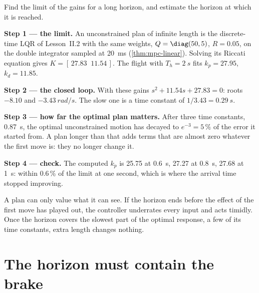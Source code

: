 \begin{example}
\label{ex:horizon-lqr}
Find the limit of the gains for a long horizon, and estimate the horizon at which it is reached.

\textbf{Step 1 — the limit.} An unconstrained plan of infinite length is the discrete-time LQR of Lesson~II.2 with the same weights, $Q = \diag(50, 5)$, $R = 0.05$, on the double integrator sampled at \SI{20}{ms} (\cref{thm:mpc-linear}). Solving its Riccati equation gives $K = [\,27.83 \;\; 11.54\,]$. The flight with $T_h = \SI{2}{s}$ fits $k_p = 27.95$, $k_d = 11.85$.

\textbf{Step 2 — the closed loop.} With these gains $s^2 + 11.54s + 27.83 = 0$: roots $-8.10$ and $\SI{-3.43}{rad/s}$. The slow one is a time constant of $1/3.43 = \SI{0.29}{s}$.

\textbf{Step 3 — how far the optimal plan matters.} After three time constants, \SI{0.87}{s}, the optimal unconstrained motion has decayed to $e^{-3} = 5\,\%$ of the error it started from. A plan longer than that adds terms that are almost zero whatever the first move is: they no longer change it.

\textbf{Step 4 — check.} The computed $k_p$ is 25.75 at \SI{0.6}{s}, 27.27 at \SI{0.8}{s}, 27.68 at \SI{1}{s}: within 0.6\,\% of the limit at one second, which is where the arrival time stopped improving.
\end{example}

\begin{keyidea}
A plan can only value what it can see. If the horizon ends before the effect of the first move has played out, the controller underrates every input and acts timidly. Once the horizon covers the slowest part of the optimal response, a few of its time constants, extra length changes nothing.
\end{keyidea}


\section{The horizon must contain the brake}

